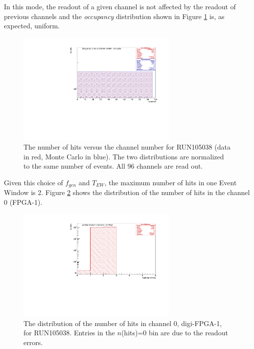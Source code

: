 In this mode, the readout of a given channel is not affected 
by the readout of previous
channels and the \textit{occupancy} distribution shown 
in Figure \ref{fig:5} is, as expected, uniform.
\begin{figure}[!h]
\centering
\includegraphics[width =0.7\textwidth]{figures/pdf/figure_00002_nhitsvschannel_roc_simulation_2.pdf}
\caption[The occupancy histogram (RUN105038).]{The number of hits versus the channel number for RUN105038 
(data in red, Monte Carlo in blue). The two distributions 
are normalized to the same number of events. All 96 channels are read out.}
\label{fig:5}
\end{figure}

Given this choice of $f_{gen}$ and $T_{EW}$, 
the maximum number of hits in one Event Window is 2.
Figure \ref{fig:67} shows the distribution of the 
number of hits in the channel 0 (FPGA-1).
\begin{figure}[!h]
\centering
\includegraphics[width =0.7\textwidth]{figures/pdf/figure_00067_nhits_ch00_run105038.pdf}
\caption[The distribution of the number of hits in channel 0.]{
  The distribution of the number of hits in channel 0, digi-FPGA-1, for RUN105038.
  Entries in the $n$(hits)=0 bin are due to the readout errors.
}
\label{fig:67}
\end{figure}

